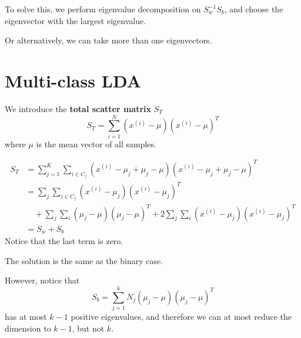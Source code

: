         To solve this, we perform eigenvalue decomposition on $S_w^{-1}S_b$, and choose the eigenvector with the largest eigenvalue.

        Or alternatively, we can take more than one eigenvectors.


\section{Multi-class LDA}
    We introduce the \textbf{total scatter matrix} $S_T$
    \[ S_T = \sum_{i=1}^N(x^{(i)}-\mu)(x^{(i)}-\mu)^T \]
    where $\mu$ is the mean vector of all samples.

    \begin{align*}
        S_T &= \sum_{j=1}^{K}\sum_{i\in C_j}(x^{(i)}-\mu_j+\mu_j-\mu)(x^{(i)}-\mu_j+\mu_j-\mu)^T\\
        &= \sum_j\sum_{i\in C_j}(x^{(i)}-\mu_j)(x^{(i)}-\mu_j)^T\\
        &\quad + \sum_j\sum_i(\mu_j-\mu)(\mu_j-\mu)^T + 2 \sum_j\sum_i(x^{(i)}-\mu_j)(x^{(i)}-\mu_j)^T\\
        &= S_w + S_b
    \end{align*}
    Notice that the last term is zero.

    The solution is the same as the binary case.

    However, notice that
    \[ S_b = \sum_{j=1}^k N_j(\mu_j-\mu)(\mu_j-\mu)^T \]
    has at most $k-1$ positive eigenvalues, and therefore we can at most reduce the dimension to $k-1$, but not $k$.
